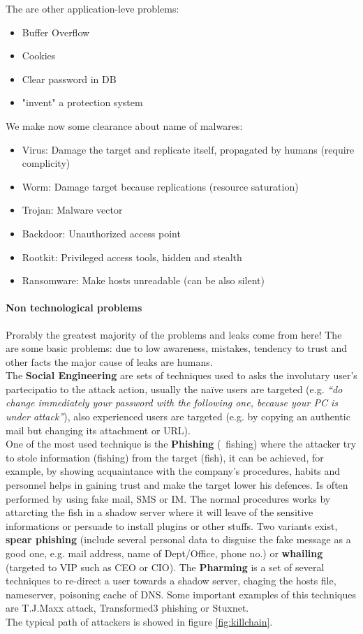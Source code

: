 \documentclass[12pt]{article}
\begin{document}
The are other application-leve problems:
\begin{itemize}
  \item Buffer Overflow
  \item Cookies
  \item Clear password in DB
  \item "invent" a protection system
\end{itemize}
We make now some clearance about name of malwares:
\begin{itemize}
  \item Virus: Damage the target and replicate itself, propagated by humans (require complicity)
  \item Worm: Damage target because replications (resource saturation)
  \item Trojan: Malware vector
  \item Backdoor: Unauthorized access point
  \item Rootkit: Privileged access tools, hidden and stealth
  \item Ransomware: Make hosts unreadable (can be also silent)
\end{itemize}

\paragraph{Non technological problems} Prorably the greatest majority of the problems and leaks come from here! The are some basic problems: due to low awareness, mistakes, tendency to trust and other facts the major cause of leaks are humans.\\
The \textbf{Social Engineering} are sets of techniques used to asks the involutary user's partecipatio to the attack action, usually the naïve users are targeted (e.g. \textit{“do change immediately your password with the following one, because your PC is under attack”}), also experienced users are targeted (e.g. by copying an authentic mail but changing its attachment or URL).\\
One of the most used technique is the \textbf{Phishing} (~fishing) where the attacker try to stole information (fishing) from the target (fish), it can be achieved, for example, by showing acquaintance with the company’s procedures, habits and personnel helps in gaining trust and make the target lower his defences. Is often performed by using fake mail, SMS or IM. The normal procedures works by attarcting the fish in a shadow server where it will leave of the sensitive informations or persuade to install plugins or other stuffs. Two variants exist, \textbf{spear phishing} (include several personal data to disguise the fake message as a good one, e.g. mail address, name of Dept/Office, phone no.) or \textbf{whailing} (targeted to VIP such as CEO or CIO).
The \textbf{Pharming} is a set of several techniques to re-direct a user towards a shadow server, chaging the hosts file, nameserver, poisoning cache of DNS. Some important examples of this techniques are T.J.Maxx attack, Transformed3 phishing or Stuxnet.\\
The typical path of attackers is showed in figure \ref{fig:killchain}.
\end{document}
